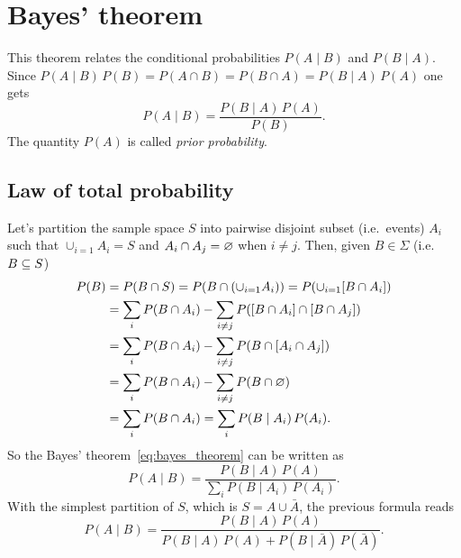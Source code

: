 \documentclass[
	10pt,
	draft
]{scrreprt}
\begin{document}
		\section{Bayes' theorem}

This theorem relates the conditional probabilities $P(A\mid B)$ and $P(B\mid A)$.
Since $P(A\mid B)\,P(B) = P(A\cap B) = P(B\cap A) = P(B\mid A)\,P(A)$ one gets
\begin{equation}\label{eq:bayes_theorem}
P(A\mid B) = \frac{P(B\mid A)\,P(A)}{P(B)}.
\end{equation}
The quantity $P(A)$ is called \emph{prior probability}.

		\subsection{Law of total probability}

Let's partition the sample space $S$ into pairwise disjoint subset (i.e.~events) $A_i$ such that $\cup_{i=1} A_i = S$ and $A_i\cap A_j = \varnothing$ when $i\neq j$.
Then, given $B\in\Sigma$ (i.e.~$B\subseteq S$)
\begin{equation}
\begin{aligned}
P(B)
&= P(B\cap S) = P(B\cap (\cup_{i=1} A_i) )= P( \cup_{i=1}[B\cap A_i] )\\
&=\sum_iP(B\cap A_i) - \sum_{i\neq j} P([B\cap A_i]\cap[B\cap A_j])\\
&=\sum_iP(B\cap A_i) - \sum_{i\neq j} P(B\cap [A_i\cap A_j])\\
&=\sum_iP(B\cap A_i) - \sum_{i\neq j} P(B\cap \varnothing)\\
&=\sum_iP(B\cap A_i) =\sum_iP(B\mid A_i)\,P(A_i).
\end{aligned}
\end{equation}
So the Bayes' theorem~\eqref{eq:bayes_theorem} can be written as 
\begin{equation}
P(A\mid B) = \frac{P(B\mid A)\,P(A)}{\sum_iP(B\mid A_i)\,P(A_i)}.
\end{equation}
With the simplest partition of $S$, which is $S=A\cup\bar A$, the previous formula reads
\begin{equation}
P(A\mid B) = \frac{P(B\mid A)\,P(A)}{P(B\mid A)\,P(A) + P(B\mid \bar A)\,P(\bar A)}.
\end{equation}
\end{document}
